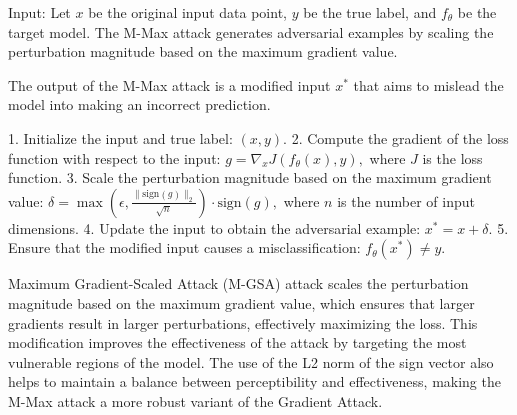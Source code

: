 Input: Let \( x \) be the original input data point, \( y \) be the true label, and \( f_{\theta} \) be the target model. The M-Max attack generates adversarial examples by scaling the perturbation magnitude based on the maximum gradient value.

The output of the M-Max attack is a modified input \( x^* \) that aims to mislead the model into making an incorrect prediction.

1. Initialize the input and true label:
   $
   (x, y).
   $
2. Compute the gradient of the loss function with respect to the input:
   $
   g = \nabla_x J(f_{\theta}(x), y),
   $
   where \( J \) is the loss function.
3. Scale the perturbation magnitude based on the maximum gradient value:
   $
   \delta = \max(\epsilon, \frac{\|\text{sign}(g)\|_2}{\sqrt{n}}) \cdot \text{sign}(g),
   $
   where \( n \) is the number of input dimensions.
4. Update the input to obtain the adversarial example:
   $
   x^* = x + \delta.
   $
5. Ensure that the modified input causes a misclassification:
   $
   f_{\theta}(x^*) \neq y.
   $

Maximum Gradient-Scaled Attack (M-GSA) attack scales the perturbation magnitude based on the maximum gradient value, which ensures that larger gradients result in larger perturbations, effectively maximizing the loss. This modification improves the effectiveness of the attack by targeting the most vulnerable regions of the model. The use of the L2 norm of the sign vector also helps to maintain a balance between perceptibility and effectiveness, making the M-Max attack a more robust variant of the Gradient Attack.